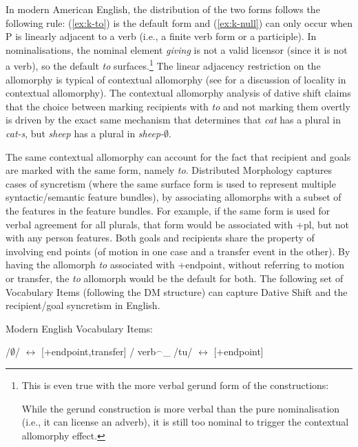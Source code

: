 	In modern American English, the distribution of the two forms follows the following rule: (\ref{ex:k-to}) is the default form and (\ref{ex:k-null}) can only occur when P is linearly adjacent to a verb (i.e., a finite verb form or a participle). In nominalisations, the nominal element \textit{giving} is not a valid licensor (since it is not a verb), so the default \textit{to} surfaces.\footnote{This is even true with the more verbal gerund form of the constructions:
	\begin{exe}
	\end{exe}
While the gerund construction is more verbal than the pure nominalisation (i.e., it can license an adverb), it is still too nominal to trigger the contextual allomorphy effect.} The linear adjacency restriction on the allomorphy is typical of contextual allomorphy (see \citet{Embick.2010} for a discussion of locality in contextual allomorphy). The contextual allomorphy analysis of dative shift claims that the choice between marking recipients with \textit{to} and not marking them overtly is driven by the exact same mechanism that determines that \textit{cat} has a plural in \textit{cat-s}, but \textit{sheep} has a plural in \textit{sheep-$\emptyset$}. 

	The same contextual allomorphy can account for the fact that recipient and goals are marked with the same form, namely \textit{to}. Distributed Morphology \citep{Halle.1993} captures cases of syncretism (where the same surface form is used to represent multiple syntactic/semantic feature bundles), by associating allomorphs with a subset of the features in the feature bundles. For example, if the same form is used for verbal agreement for all plurals, that form would be associated with +pl, but not with any person features. Both goals and recipients share the property of involving end points (of motion in one case and a transfer event in the other). By having the allomorph \textit{to} associated with +endpoint, without referring to motion or transfer, the \textit{to} allomorph would be the default for both. The following set of Vocabulary Items (following the DM structure) can capture Dative Shift and the recipient/goal syncretism in English.

	\begin{exe}
		\ex Modern English Vocabulary Items:\label{ex:mevi}
		\begin{xlist}
			\ex /$\emptyset$/ $\leftrightarrow$ [+endpoint,transfer] / verb$^{\smallfrown}$\_
			\ex /tu/ $\leftrightarrow$ [+endpoint]
		\end{xlist}
	\end{exe}


